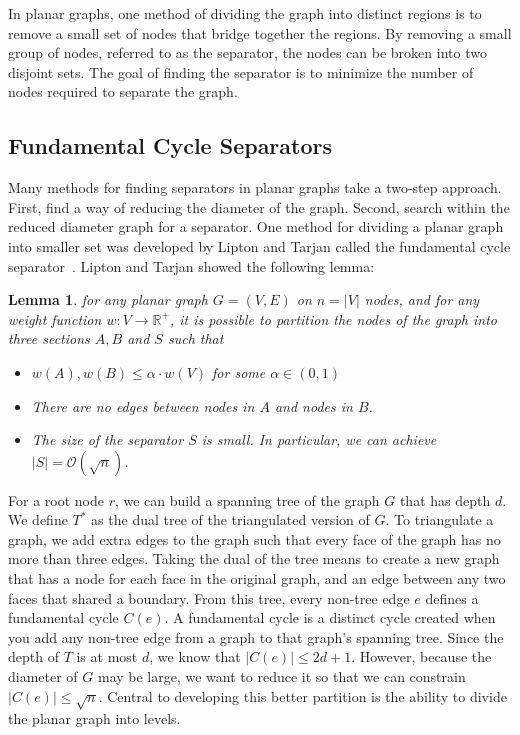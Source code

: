 \documentclass[11pt]{article}
\newtheorem{lemma}[theorem]{Lemma}
\begin{document}
In planar graphs, one method of dividing the graph into distinct regions is to remove a small set of nodes that bridge together the regions. By removing a small group of nodes, referred to as the separator, the nodes can be broken into two disjoint sets. The goal of finding the separator is to minimize the number of nodes required to separate the graph.

\subsection{Fundamental Cycle Separators}
\label{sec:graph-sep-fund-cycle-sep}

Many methods for finding separators in planar graphs take a two-step approach. First, find a way of reducing the diameter of the graph. Second, search within the reduced diameter graph for a separator. One method for dividing a planar graph into smaller set was developed by Lipton and Tarjan called the fundamental cycle separator~\cite{lipton1979separator}. Lipton and Tarjan showed the following lemma: \\

\begin{lemma}
    \label{lemma:separator}
    for any planar graph $G = (V,E)$ on $n = |V|$ nodes, and for any weight function $w: V \rightarrow \mathbb{R}^+$, it is possible to partition the nodes of the graph into three sections $A, B$ and $S$ such that
    \begin{itemize}
        \item $w(A), w(B) \leq \alpha \cdot w(V)$ for some $\alpha \in (0,1)$
        
        \item There are no edges between nodes in $A$ and nodes in $B$.
        
        \item The size of the separator $S$ is small. In particular, we can achieve $|S| = \mathcal{O}(\sqrt{n})$.
    \end{itemize}
\end{lemma}

For a root node $r$, we can build a spanning tree of the graph $G$ that has depth $d$. We define $T^*$ as the dual tree of the triangulated version of $G$. To triangulate a graph, we add extra edges to the graph such that every face of the graph has no more than three edges. Taking the dual of the tree means to create a new graph that has a node for each face in the original graph, and an edge between any two faces that shared a boundary. From this tree, every non-tree edge $e$ defines a fundamental cycle $C(e)$. A fundamental cycle is a distinct cycle created when you add any non-tree edge from a graph to that graph's spanning tree. Since the depth of $T$ is at most $d$, we know that $|C(e)| \leq 2d + 1$. However, because the diameter of $G$ may be large, we want to reduce it so that we can constrain $|C(e)| \leq \sqrt{n}$. Central to developing this better partition is the ability to divide the planar graph into levels.
\end{document}
